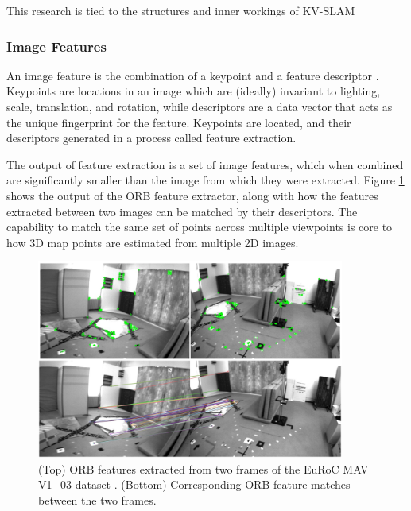This research is tied to the structures and inner workings of KV-SLAM

\subsubsection{Image Features}

An image feature is the combination of a keypoint and a feature descriptor \cite{loweObjectRecognitionLocal1999}. Keypoints are locations in an image which are (ideally) invariant to lighting, scale, translation, and rotation\cite{shiGoodFeaturesTrack1994}, while descriptors are a data vector that acts as the unique fingerprint for the feature. Keypoints are located, and their descriptors generated in a process called feature extraction.

The output of feature extraction is a set of image features, which when combined are significantly smaller than the image from which they were extracted. Figure \ref{fig:feature_extraction_and_matching} shows the output of the ORB feature extractor, along with how the features extracted between two images can be matched by their descriptors. The capability to match the same set of points across multiple viewpoints is core to how 3D map points are estimated from multiple 2D images.

\begin{figure}[!ht]
    \centering
    \includegraphics[width=0.9\textwidth]{resources/feature_extraction_and_matching.png}
    \caption[Image Feature Extraction and Matching]{(Top) ORB features extracted from two frames of the EuRoC MAV V1\_03 dataset \cite{burriEuRoCMicroAerial2016}. (Bottom) Corresponding ORB feature matches between the two frames.}
    \label{fig:feature_extraction_and_matching}
\end{figure}

